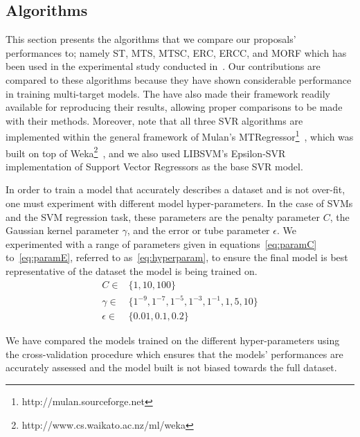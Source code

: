 \documentclass[preprint,12pt]{elsarticle}
\begin{document}
\subsection{Algorithms}\label{subsec:algorithmsres}
This section presents the algorithms that we compare our proposals' performances to; namely ST, MTS, MTSC, ERC, ERCC, and MORF which has been used in the experimental study conducted in~\cite{Spyromitros2014}. Our contributions are compared to these algorithms because they have shown considerable performance in training multi-target models. The have also made their framework readily available for reproducing their results, allowing proper comparisons to be made with their methods. Moreover, note that all three SVR algorithms are implemented within the general framework of Mulan's MTRegressor\footnote{http://mulan.sourceforge.net}~\cite{mulan}, which was built on top of Weka\footnote{http://www.cs.waikato.ac.nz/ml/weka}~\cite{weka}, and we also used LIBSVM's Epsilon-SVR~\cite{CC01a} implementation of Support Vector Regressors as the base SVR model.

In order to train a model that accurately describes a dataset and is not over-fit, one must experiment with different model hyper-parameters. In the case of SVMs and the SVM regression task, these parameters are the penalty parameter $C$, the Gaussian kernel parameter $\gamma$, and the error or tube parameter $\epsilon$. We experimented with a range of parameters given in equations~\eqref{eq:paramC} to~\eqref{eq:paramE}, referred to as~\eqref{eq:hyperparam}, to ensure the final model is best representative of the dataset the model is being trained on.
\begin{subequations}
\label{eq:hyperparam}
\begin{align}
C \in  & \{1, 10, 100\} \label{eq:paramC}\\
\gamma \in  & \{1^{-9}, 1^{-7}, 1^{-5}, 1^{-3}, 1^{-1}, 1, 5, 10\} \label{eq:paramG}\\
\epsilon \in  & \{0.01, 0.1, 0.2\} \label{eq:paramE}
\end{align}
\end{subequations}

We have compared the models trained on the different hyper-parameters using the cross-validation procedure which ensures that the models' performances are accurately assessed and the model built is not biased towards the full dataset. %
\end{document}
